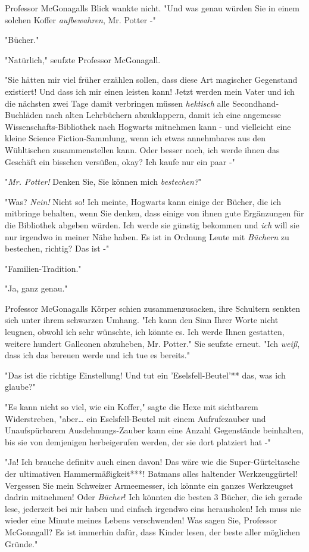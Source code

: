 {Professor McGonagalls Blick wankte nicht. "Und was genau würden Sie in einem solchen Koffer \emph{aufbewahren}, Mr. Potter -"

"Bücher."

"Natürlich," seufzte Professor McGonagall.

"Sie hätten mir viel früher erzählen sollen, dass diese Art magischer Gegenstand existiert! Und dass ich mir einen leisten kann! Jetzt werden mein Vater und ich die nächsten zwei Tage damit verbringen müssen \emph{hektisch} alle Secondhand-Buchläden nach alten Lehrbüchern abzuklappern, damit ich eine angemesse Wissenschafts-Bibliothek nach Hogwarts mitnehmen kann - und vielleicht eine kleine Science Fiction-Sammlung, wenn ich etwas annehmbares aus den Wühltischen zusammenstellen kann. Oder besser noch, ich werde ihnen das Geschäft ein bisschen versüßen, okay? Ich kaufe nur ein paar -"

"\emph{Mr. Potter!} Denken Sie, Sie können mich \emph{bestechen?}"

"Was? \emph{Nein!} Nicht so! Ich meinte, Hogwarts kann einige der Bücher, die ich mitbringe behalten, wenn Sie denken, dass einige von ihnen gute Ergänzungen für die Bibliothek abgeben würden. Ich werde sie günstig bekommen und \emph{ich} will sie nur irgendwo in meiner Nähe haben. Es ist in Ordnung Leute mit \emph{Büchern} zu bestechen, richtig? Das ist -"

"Familien-Tradition."

"Ja, ganz genau."

Professor McGonagalls Körper schien zusammenzusacken, ihre Schultern senkten sich unter ihrem schwarzen Umhang. "Ich kann den Sinn Ihrer Worte nicht leugnen, obwohl ich sehr wünschte, ich könnte es. Ich werde Ihnen gestatten, weitere hundert Galleonen abzuheben, Mr. Potter." Sie seufzte erneut. "Ich \emph{weiß}, dass ich das bereuen werde und ich tue es bereits."

"Das ist die richtige Einstellung! Und tut ein 'Eselsfell-Beutel'** das, was ich glaube?"

"Es kann nicht so viel, wie ein Koffer," sagte die Hexe mit sichtbarem Widerstreben, "aber… ein Eselsfell-Beutel mit einem Aufrufezauber und Unaufspürbarem Ausdehnungs-Zauber kann eine Anzahl Gegenstände beinhalten, bis sie von demjenigen herbeigerufen werden, der sie dort platziert hat -"

"Ja! Ich brauche definitv auch einen davon! Das wäre wie die Super-Gürteltasche der ultimativen Hammermäßigkeit***! Batmans alles haltender Werkzeuggürtel! Vergessen Sie mein Schweizer Armeemesser, ich könnte ein ganzes Werkzeugset dadrin mitnehmen! Oder \emph{Bücher}! Ich könnten die besten 3 Bücher, die ich gerade lese, jederzeit bei mir haben und einfach irgendwo eins herausholen! Ich muss nie wieder eine Minute meines Lebens verschwenden! Was sagen Sie, Professor McGonagall? Es ist immerhin dafür, dass Kinder lesen, der beste aller möglichen Gründe."

}
